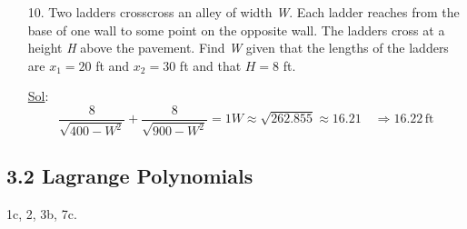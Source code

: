 \begin{enumerate}
  \item[10.] Two ladders crosscross an alley of width \textit{W}.
    Each ladder reaches from the base of one wall to some point on
    the opposite wall. The ladders cross at a height \textit{H} above
    the pavement. Find \textit{W} given that the lengths of the
    ladders are \( x_1 = 20 \) ft and \( x_2  = 30 \) ft and that \(
    H = 8 \) ft.

    \underline{Sol}:
    \[
      \frac{8}{\sqrt{400 - W^2}} + \frac{8}{\sqrt{900 - W^2}} = 1
      W \approx \sqrt{262.855} \approx 16.21 \quad \Rightarrow
      \boxed{16.22 \, \text{ft}}
    \]

\end{enumerate}

\subsection*{3.2 Lagrange Polynomials}

1c, 2, 3b, 7c.

